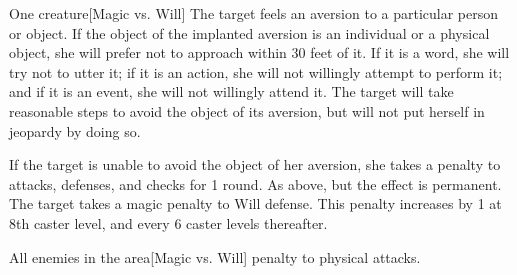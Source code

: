 \begin{spellheader}
    \spellrng{\rngmed}
\end{spellheader}
\begin{spelleffects}
    \begin{spelltarget}{One creature}[Magic vs. Will]
        \spellsuccess The target feels an aversion to a particular person or object. If the object of the implanted aversion is an individual or a physical object, she will prefer not to approach within 30 feet of it. If it is a word, she will try not to utter it; if it is an action, she will not willingly attempt to perform it; and if it is an event, she will not willingly attend it. The target will take reasonable steps to avoid the object of its aversion, but will not put herself in jeopardy by doing so.
        \par If the target is unable to avoid the object of her aversion, she takes a  penalty to attacks, defenses, and checks for 1 round.
        \spellcritical As above, but the effect is permanent.
        \spellfailure The target takes a  magic penalty to Will defense. This penalty increases by 1 at 8th caster level, and every 6 caster levels thereafter.
    \end{spelltarget}
\end{spelleffects}

\begin{comment}
\subsubsection{B}
\end{comment}

\begin{spellheader}
\end{spellheader}
\begin{spelleffects}
    \begin{spelltargets}{All enemies in the area}[Magic vs. Will]
        \spellsuccess {} penalty to physical attacks.
    \end{spelltargets}
\end{spelleffects}

